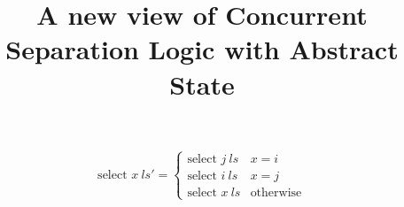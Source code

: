 \documentclass[8pt]{article}
\title{A new view of Concurrent Separation Logic with Abstract State}
\begin{document}
$$
\text{select } x \ ls' = \left\{\begin{array}{cc}\text{select } j \ ls  & x = i \\\text{select } i \ ls  & x = j \\\text{select } x \ ls  & \text{otherwise}\end{array}\right.
$$
\end{document}
